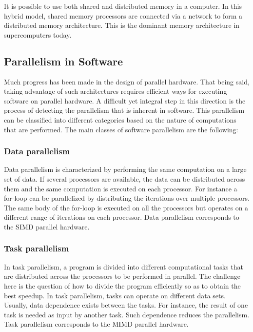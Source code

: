 It is possible to use both shared and distributed memory in a computer. In this hybrid model, shared memory processors are connected via a network to form a distributed memory architecture. This is the dominant memory architecture in supercomputers today.

\subsection{Parallelism in Software}

Much progress has been made in the design of parallel hardware. That being said, taking advantage of such architectures requires efficient ways for executing software on parallel hardware. A difficult yet integral step in this direction is the process of detecting the parallelism that is inherent in software. This parallelism can be classified into different categories based on the nature of computations that are performed. The main classes of software parallelism are the following:    

\subsubsection{Data parallelism}
Data parallelism is characterized by performing the same computation on a large set of data. If several processors are available, the data can be distributed across them and the same computation is executed on each processor. For instance a for-loop can be parallelized by distributing the iterations over multiple processors. The same body of the for-loop is executed on all the processors but operates on a different range of iterations on each processor. Data parallelism corresponds to the SIMD parallel hardware.

\subsubsection{Task parallelism}
In task parallelism, a program is divided into different computational tasks that are distributed across the processors to be performed in parallel. The challenge here is the question of how to divide the program efficiently so as to obtain the best speedup. In task parallelism, tasks can operate on different data sets. Usually, data dependence exists between the tasks. For instance, the result of one task is needed as input by another task. Such dependence reduces the parallelism. Task parallelism corresponds to the MIMD parallel hardware.

